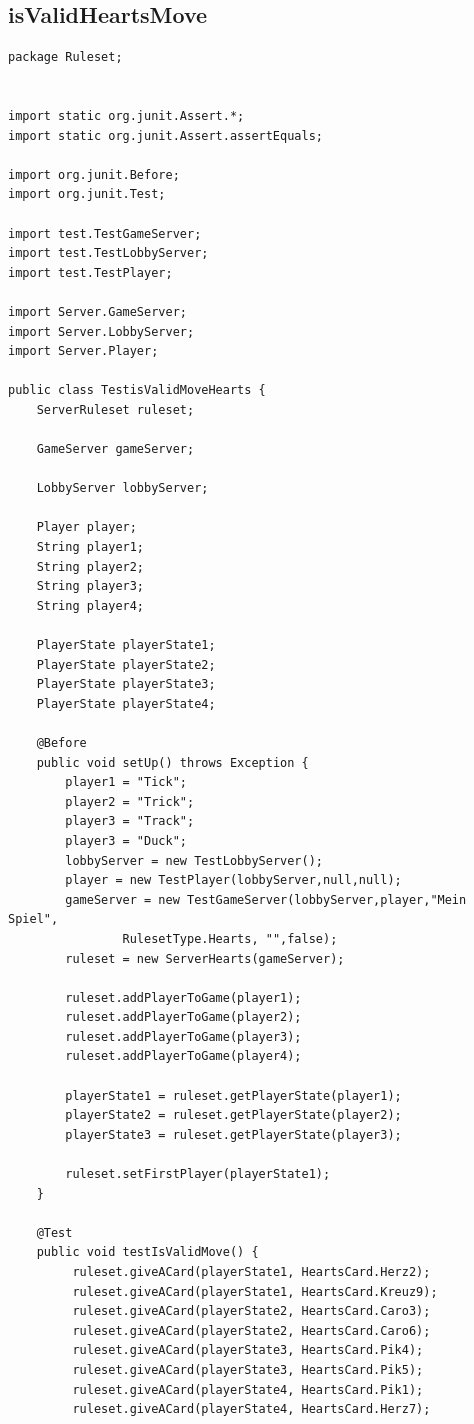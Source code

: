 \documentclass[twoside]{article}
\begin{document}
\subsection{isValidHeartsMove}
\begin{lstlisting}
package Ruleset;


import static org.junit.Assert.*;
import static org.junit.Assert.assertEquals;

import org.junit.Before;
import org.junit.Test;

import test.TestGameServer;
import test.TestLobbyServer;
import test.TestPlayer;

import Server.GameServer;
import Server.LobbyServer;
import Server.Player;

public class TestisValidMoveHearts {
	ServerRuleset ruleset;
	
	GameServer gameServer;
	
	LobbyServer lobbyServer;
	
	Player player;
	String player1;
	String player2;
	String player3;
	String player4;
	
	PlayerState playerState1;
	PlayerState playerState2;
	PlayerState playerState3;
	PlayerState playerState4;
	
	@Before
	public void setUp() throws Exception {
		player1 = "Tick";
		player2 = "Trick";
		player3 = "Track";
		player3 = "Duck";
		lobbyServer = new TestLobbyServer();
		player = new TestPlayer(lobbyServer,null,null);
		gameServer = new TestGameServer(lobbyServer,player,"Mein Spiel",
				RulesetType.Hearts, "",false);
		ruleset = new ServerHearts(gameServer);
		
		ruleset.addPlayerToGame(player1);
        ruleset.addPlayerToGame(player2);
        ruleset.addPlayerToGame(player3);
        ruleset.addPlayerToGame(player4);
        
        playerState1 = ruleset.getPlayerState(player1);
        playerState2 = ruleset.getPlayerState(player2);
        playerState3 = ruleset.getPlayerState(player3);

        ruleset.setFirstPlayer(playerState1);
	}
	
	@Test
	public void testIsValidMove() {
		 ruleset.giveACard(playerState1, HeartsCard.Herz2);
	     ruleset.giveACard(playerState1, HeartsCard.Kreuz9);
	     ruleset.giveACard(playerState2, HeartsCard.Caro3);
	     ruleset.giveACard(playerState2, HeartsCard.Caro6);
	     ruleset.giveACard(playerState3, HeartsCard.Pik4);
	     ruleset.giveACard(playerState3, HeartsCard.Pik5);
         ruleset.giveACard(playerState4, HeartsCard.Pik1);
	     ruleset.giveACard(playerState4, HeartsCard.Herz7);
	     

\end{lstlisting}
\end{document}
